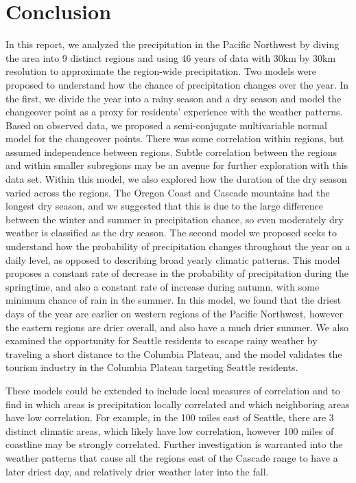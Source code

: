 \documentclass{article}
\begin{document}
\section{Conclusion}

In this report, we analyzed the precipitation in the Pacific Northwest by diving the area into 9 distinct regions and using 46 years of data with 30km by 30km resolution to approximate the region-wide precipitation.
Two models were proposed to understand how the chance of precipitation changes over the year. In the first, we divide the year into a rainy season and a dry season and model the changeover point as a proxy for residents' experience with the weather patterns. 
Based on observed data, we proposed a semi-conjugate multivariable normal model for the changeover points. There was some correlation within regions, but assumed independence between regions. Subtle correlation between the regions and within smaller subregions may be an avenue for further exploration with this data set.
Within this model, we also explored how the duration of the dry season varied across the regions. The Oregon Coast and Cascade mountains had the longest dry season, and we suggested that this is due to the large difference between the winter and summer in precipitation chance, so even moderately dry weather is classified as the dry season. 
The second model we proposed seeks to understand how the probability of precipitation changes throughout the year on a daily level, as opposed to describing broad yearly climatic patterns. This model proposes a constant rate of decrease in the probability of precipitation during the springtime, and also a constant rate of increase during autumn, with some minimum chance of rain in the summer.
In this model, we found that the driest days of the year are earlier on western regions of the Pacific Northwest, however the eastern regions are drier overall, and also have a much drier summer. We also examined the opportunity for Seattle residents to escape rainy weather by traveling a short distance to the Columbia Plateau, and the model validates the tourism industry in the Columbia Plateau targeting Seattle residents. 

These models could be extended to include local measures of correlation and to find in which areas is precipitation locally correlated and which neighboring areas have low correlation. For example, in the 100 miles east of Seattle, there are 3 distinct climatic areas, which likely have low correlation, however 100 miles of coastline may be strongly correlated.
Further investigation is warranted into the weather patterns that cause all the regions east of the Cascade range to have a later driest day, and relatively drier weather later into the fall.




 
\end{document}
